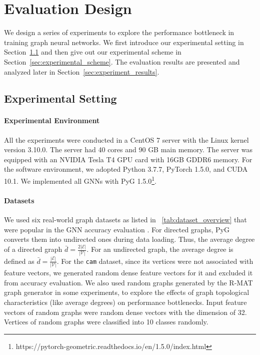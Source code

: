 \section{Evaluation Design}
\label{sec:experimental_design}

We design a series of experiments to explore the performance bottleneck in training graph neural networks.
We first introduce our experimental setting in Section~\ref{sec:experimental_env} and then give out our experimental scheme in Section~\ref{sec:experimental_scheme}.
The evaluation results are presented and analyzed later in Section~\ref{sec:experiment_results}.

\subsection{Experimental Setting}
\label{sec:experimental_env}

\paragraph{Experimental Environment}
All the experiments were conducted in a CentOS 7 server with the Linux kernel version 3.10.0.
The server had 40 cores and 90 GB main memory.
The server was equipped with an NVIDIA Tesla T4 GPU card with 16GB GDDR6 memory.
For the software environment, we adopted Python 3.7.7, PyTorch 1.5.0, and CUDA 10.1.
We implemented all GNNs with PyG 1.5.0\footnote{https://pytorch-geometric.readthedocs.io/en/1.5.0/index.html}.

\paragraph{Datasets}

We used six real-world graph datasets as listed in \tablename~\ref{tab:dataset_overview} that were popular in the GNN accuracy evaluation \cite{yang2016_revisiting_semisupervised, zeng2020_graphsaint, shchur2018_pitfall_of_gnn}.
%
For directed graphs, PyG converts them into undirected ones during data loading.
%
Thus, the average degree of a directed graph $\bar{d}=\frac{2|\mathcal{E}|}{|\mathcal{V}|}$.
%
For an undirected graph, the average degree is defined as $\bar{d}=\frac{|\mathcal{E}|}{|\mathcal{V}|}$.
%
For the \texttt{cam} dataset, since its vertices were not associated with feature vectors, we generated random dense feature vectors for it and excluded it from accuracy evaluation.
%
We also used random graphs generated by the R-MAT graph generator \cite{rmat-generator} in some experiments, to explore the effects of graph topological characteristics (like average degrees) on performance bottlenecks.
%
Input feature vectors of random graphs were random dense vectors with the dimension of 32.
%
Vertices of random graphs were classified into 10 classes randomly.

